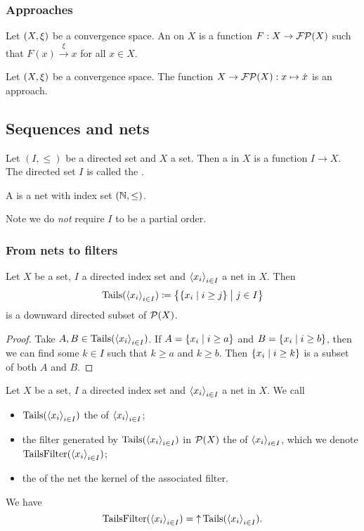 \subsubsection{Approaches}
\begin{definition}
Let $\left( X,\xi \right)$ be a convergence space. An  on $X$ is a function $F: X\to \operatorname{\mathcal{FP}}(X)$ such that $F(x) \overset{\xi}{\longrightarrow} x$ for all $x\in X$.
\end{definition}

\begin{lemma}
Let $\left( X,\xi \right)$ be a convergence space. The function $X\to \operatorname{\mathcal{FP}}(X): x\mapsto \dot{x}$ is an approach.
\end{lemma}

\subsection{Sequences and nets}
\begin{definition}
Let $(I,\leq)$ be a directed set and $X$ a set. Then a  in $X$ is a function $I\to X$. The directed set $I$ is called the .

A  is a net with index set $\left( \mathbb{N}, \leq \right)$.
\end{definition}
Note we do \emph{not} require $I$ to be a partial order.

\subsubsection{From nets to filters}
\begin{lemma}
Let $X$ be a set, $I$ a directed index set and $\left\langle x_i \right\rangle_{i\in I}$ a net in $X$. Then
\[ \Tails(\seq{x_i}_{i\in I}) \defeq \setbuilder[\big]{\setbuilder{x_i}{i \geq j}}{j\in I} \]
is a downward directed subset of $\operatorname{\mathcal{P}}(X)$.
\end{lemma}
\begin{proof}
Take $A,B\in \operatorname{Tails}(\left\langle x_i \right\rangle_{i\in I})$. If $A = \setbuilder{x_i}{i \geq a}$ and $B = \setbuilder{x_i}{i \geq b}$, then we can find some $k\in I$ such that $k \geq a$ and $k\geq b$. Then $\setbuilder{x_i}{i \geq k}$ is a subset of both $A$ and $B$.
\end{proof}

\begin{definition}
Let $X$ be a set, $I$ a directed index set and $\left\langle x_i \right\rangle_{i\in I}$ a net in $X$. We call
\begin{itemize}
\item $\operatorname{Tails}(\left\langle x_i \right\rangle_{i\in I})$ the  of $\left\langle x_i \right\rangle_{i\in I}$;
\item the filter generated by $\operatorname{Tails}(\left\langle x_i \right\rangle_{i\in I})$ in $\operatorname{\mathcal{P}}(X)$ the  of $\left\langle x_i \right\rangle_{i\in I}$, which we denote $\operatorname{TailsFilter}(\left\langle x_i \right\rangle_{i\in I})$;
\item the  of the net the kernel of the associated filter.
\end{itemize}
We have 
\[ \operatorname{TailsFilter}(\left\langle x_i \right\rangle_{i\in I}) = \operatorname{\uparrow} \operatorname{Tails}(\left\langle x_i \right\rangle_{i\in I}). \]
\end{definition}

